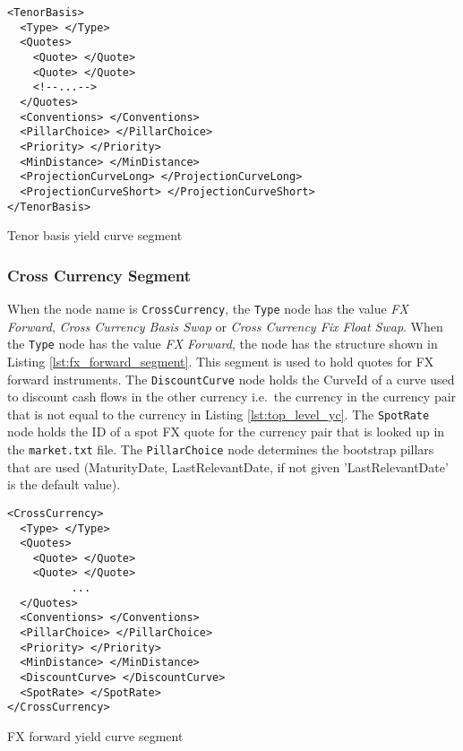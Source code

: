 \begin{listing}[H]
\begin{verbatim}
<TenorBasis>
  <Type> </Type>
  <Quotes>
    <Quote> </Quote>
    <Quote> </Quote>
    <!--...-->
  </Quotes>
  <Conventions> </Conventions>
  <PillarChoice> </PillarChoice>
  <Priority> </Priority>
  <MinDistance> </MinDistance>
  <ProjectionCurveLong> </ProjectionCurveLong>
  <ProjectionCurveShort> </ProjectionCurveShort>
</TenorBasis>
\end{verbatim}
\caption{Tenor basis yield curve segment}
\label{lst:tenor_basis_segment}
\end{listing}

\subsubsection*{Cross Currency Segment}
When the node name is \lstinline!CrossCurrency!, the \lstinline!Type! node has the value \emph{FX Forward}, \emph{Cross
Currency Basis Swap} or \emph{Cross Currency Fix Float Swap}. When the \lstinline!Type! node has the value \emph{FX
Forward}, the node has the structure shown in Listing \ref{lst:fx_forward_segment}. This segment is used to hold quotes
for FX forward instruments. The \lstinline!DiscountCurve! node holds the CurveId of a curve used to discount cash flows
in the other currency i.e.\ the currency in the currency pair that is not equal to the currency in Listing
\ref{lst:top_level_yc}. The \lstinline!SpotRate! node holds the ID of a spot FX quote for the currency pair that is
looked up in the {\tt market.txt} file. The \lstinline!PillarChoice! node determines the bootstrap pillars that are used
(MaturityDate, LastRelevantDate, if not given 'LastRelevantDate' is the default value).

\begin{listing}[H]
\begin{verbatim}
<CrossCurrency>
  <Type> </Type>
  <Quotes>
    <Quote> </Quote>
    <Quote> </Quote>
          ...
  </Quotes>
  <Conventions> </Conventions>
  <PillarChoice> </PillarChoice>
  <Priority> </Priority>
  <MinDistance> </MinDistance>
  <DiscountCurve> </DiscountCurve>
  <SpotRate> </SpotRate>
</CrossCurrency>
\end{verbatim}
\caption{FX forward yield curve segment}
\label{lst:fx_forward_segment}
\end{listing}

